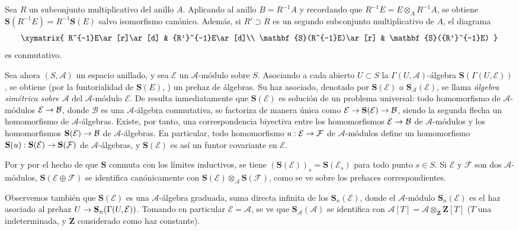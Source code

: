 \documentclass[oneside,10pt]{amsart}
\makeatletter
\newcommand{\ega@arrow}[2]{\mathchoice{#1}{#2}{#2}{#2}}
\renewcommand{\to}{\ega@arrow{\longrightarrow}{\rightarrow}}
\newcommand{\oldpage}[2][]{\marginnote{\normalfont\footnotesize\textbf{#1}~|~#2}\ignorespaces}
\let\EGAOriginalLabel\label
\renewcommand{\label}[1]{\phantomsection\EGAOriginalLabel{#1}}
\makeatother
\begin{document}
\begin{env}[1.7.3]
\label{II.1.7.3-fr}
Sea $R$ un subconjunto multiplicativo del anillo $A$.
Aplicando  al anillo $B=R^{-1}A$ y recordando que $R^{-1}E=E\otimes_A R^{-1}A$, se obtiene $\mathbf{S}(R^{-1}E)=R^{-1}\mathbf{S}(E)$ salvo isomorfismo canónico.
Además, si $R'\supset R$ es un segundo subconjunto multiplicativo de $A$, el diagrama
\[
  \xymatrix{
    R^{-1}E\ar[r]\ar[d] & {R'}^{-1}E\ar[d]\\
    \mathbf{S}(R^{-1}E)\ar[r] & \mathbf{S}({R'}^{-1}E)
  }
\]
es conmutativo.
\end{env}

\begin{env}[1.7.4]
\label{II.1.7.4-fr}
Sea ahora $(S,\mathcal{A})$ un espacio anillado, y sea $\mathcal{E}$ un $\mathcal{A}$-módulo sobre $S$.
Asociando a cada abierto $U\subset S$ la $\Gamma(U,\mathcal{A})$-álgebra $\mathbf{S}(\Gamma(U,\mathcal{E}))$, se obtiene (por la funtorialidad de $\mathbf{S}(E)$, ) un prehaz de álgebras.
Su haz asociado, denotado por $\mathbf{S}(\mathcal{E})$ o $\mathbf{S}_{\mathcal{A}}(\mathcal{E})$, se llama \emph{álgebra simétrica sobre $\mathcal{A}$} del $\mathcal{A}$-módulo $\mathcal{E}$.
De  resulta inmediatamente que $\mathbf{S}(\mathcal{E})$ es solución de un problema universal: todo homomorfismo de $\mathcal{A}$-módulos $\mathcal{E}\to\mathcal{B}$, donde $\mathcal{B}$ es una $\mathcal{A}$-álgebra conmutativa, se factoriza de manera única como
$\mathcal{E}\to\mathbf{S}(\mathcal{E})\to\mathcal{B}$,
siendo la segunda flecha un homomorfismo de $\mathcal{A}$-álgebras.
Existe, por tanto, una correspondencia biyectiva entre los homomorfismos $\mathcal{E}\to\mathcal{B}$ de $\mathcal{A}$-módulos y los homomorfismos $\mathbf{S}(\mathcal{E})\to\mathcal{B}$ de $\mathcal{A}$-álgebras.
En particular, todo homomorfismo $u:\mathcal{E}\to\mathcal{F}$ de $\mathcal{A}$-módulos define un homomorfismo $\mathbf{S}(u):\mathbf{S}(\mathcal{E})\to\mathbf{S}(\mathcal{F})$ de $\mathcal{A}$-álgebras, y $\mathbf{S}(\mathcal{E})$ es así un funtor covariante en $\mathcal{E}$.

\oldpage[II]{16}
Por  y por el hecho de que $\mathbf{S}$ conmuta con los límites inductivos, se tiene $(\mathbf{S}(\mathcal{E}))_s=\mathbf{S}(\mathcal{E}_s)$ para todo punto $s\in S$.
Si $\mathcal{E}$ y $\mathcal{F}$ son dos $\mathcal{A}$-módulos, $\mathbf{S}(\mathcal{E}\oplus\mathcal{F})$ se identifica canónicamente con $\mathbf{S}(\mathcal{E})\otimes_{\mathcal{A}}\mathbf{S}(\mathcal{F})$, como se ve sobre los prehaces correspondientes.

Observemos también que $\mathbf{S}(\mathcal{E})$ es una $\mathcal{A}$-álgebra graduada, suma directa infinita de los $\mathbf{S}_n(\mathcal{E})$, donde el $\mathcal{A}$-módulo $\mathbf{S}_n(\mathcal{E})$ es el haz asociado al prehaz $U\to\mathbf{S}_n(\Gamma(U,\mathcal{E}))$.
Tomando en particular $\mathcal{E}=\mathcal{A}$, se ve que $\mathbf{S}_{\mathcal{A}}(\mathcal{A})$ se identifica con $\mathcal{A}[T]=\mathcal{A}\otimes_{\mathbf{Z}}\mathbf{Z}[T]$ ($T$ una indeterminada, y $\mathbf{Z}$ considerado como haz constante).
\end{env}
\end{document}
